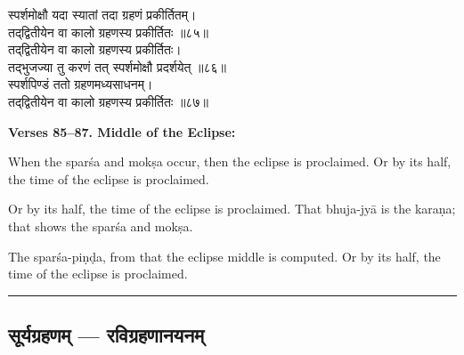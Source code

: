 \documentclass[11pt,a4paper]{article}
\newcommand{\longline}{\noindent\rule{\textwidth}{0.4pt}}
\newcommand{\dev}[1]{{\devanagarifont #1}}
\newcommand{\sectsep}{\par\vspace{0.8em}\longline\vspace{0.8em}}
\begin{document}
\begin{minipage}[t]{0.48\textwidth}
\small\devanagarifont
स्पर्शमोक्षौ यदा स्यातां तदा ग्रहणं प्रकीर्तितम्।\\
तद्‌द्वितीयेन वा कालो ग्रहणस्य प्रकीर्तितः ॥८५॥\\[0.5em]
तद्‌द्वितीयेन वा कालो ग्रहणस्य प्रकीर्तितः।\\
तद्‌भुजज्या तु करणं तत् स्पर्शमोक्षौ प्रदर्शयेत् ॥८६॥\\[0.5em]
स्पर्शपिण्डं ततो ग्रहणमध्यसाधनम्।\\
तद्‌द्वितीयेन वा कालो ग्रहणस्य प्रकीर्तितः ॥८७॥
\end{minipage}%
\hfill
\begin{minipage}[t]{0.48\textwidth}
\small
\textbf{Verses 85--87. Middle of the Eclipse:}

When the spar\'sa and mok\d{s}a occur, then the eclipse is proclaimed. Or by its half, the time of the eclipse is proclaimed.

Or by its half, the time of the eclipse is proclaimed. That bhuja-jy\=a is the kara\d{n}a; that shows the spar\'sa and mok\d{s}a.

The spar\'sa-pi\d{n}\d{d}a, from that the eclipse middle is computed. Or by its half, the time of the eclipse is proclaimed.
\end{minipage}

\sectsep

\subsection{\dev{सूर्यग्रहणम् --- रविग्रहणानयनम्}}
\end{document}
